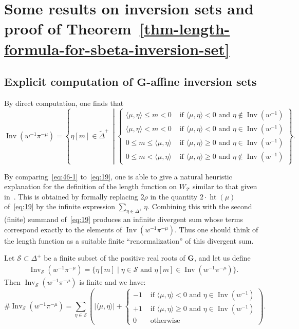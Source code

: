 \documentclass[ALCO,ThmDefs,Unicode]{cedram}
\DeclareMathOperator{\height}{ht}
\DeclareMathOperator{\Inv}{Inv}
\newcommand{\bG}{\mathbf{G}}
\newcommand{\cS}{\mathcal{S}}
\newcommand{\cT}{\mathcal{T}}
\newcommand{\suchthat}{\mid}
\newcommand{\textif}{\text{ if }}
\newcommand{\textand}{\text{ and }}
\newcommand{\tDelta}{\widetilde{\Delta}}
\begin{document}
\section{Some results on inversion sets and proof of Theorem~\ref{thm-length-formula-for-sbeta-inversion-set}}

\subsection{Explicit computation of \texorpdfstring{$\bG$}{G}-affine inversion sets}

By direct computation, one finds that
\begin{equation}\label{eq:46-1}
\Inv(w^{-1}\pi^{-\mu}) = \left\{ \eta[m]\in\tDelta^+ \,\middle|
\begin{cases}
\langle \mu, \eta \rangle \leq m < 0 & \textif \langle \mu, \eta \rangle < 0 \textand \eta \notin \Inv(w^{-1}) \\
\langle \mu, \eta \rangle < m < 0 & \textif \langle \mu, \eta \rangle < 0 \textand \eta \in \Inv(w^{-1}) \\
0 \leq m \leq \langle \mu, \eta \rangle & \textif \langle \mu, \eta \rangle \geq 0 \textand \eta \in \Inv(w^{-1}) \\
0 \leq m < \langle \mu, \eta \rangle & \textif \langle \mu, \eta \rangle \geq 0 \textand \eta \notin \Inv(w^{-1})
\end{cases}
\right\}.
\end{equation}

\begin{rema}
By comparing~\eqref{eq:46-1} to~\eqref{eq:19}, one is able to give a natural heuristic explanation for the definition of the length function on $W_\cT$ similar to that given in~\cite[\S2.11]{K}. This is obtained by formally replacing $2\rho$ in the quantity $2\cdot\height(\mu)$ of~\eqref{eq:19} by the infinite expression $\sum_{\eta\in\Delta^+} \eta$. Combining this with the second (finite) summand of~\eqref{eq:19} produces an infinite divergent sum whose terms correspond exactly to the elements of $\Inv(w^{-1}\pi^{-\mu})$. Thus one should think of the length function as a suitable finite ``renormalization'' of this divergent sum.
\end{rema}

Let $\cS \subset \Delta^+$ be a finite subset of the positive real roots of $\bG$, and let us define
\begin{align*}
\Inv_{\cS}(w^{-1} \pi^{-\mu}) = \{ \eta[m] \suchthat \eta \in \cS \textand \eta[m] \in \Inv(w^{-1} \pi^{-\mu}) \}.
\end{align*}
Then $\Inv_{\cS}(w^{-1} \pi^{-\mu})$ is finite and we have:
\begin{equation}\label{E:invS}
\# \Inv_{\cS}(w^{-1} \pi^{-\mu}) = \sum_{\eta \in \cS} \left(|\langle \mu, \eta \rangle| +
\begin{cases}
-1 & \textif \langle \mu, \eta \rangle < 0 \textand \eta \in \Inv(w^{-1}) \\
+1 & \textif \langle \mu, \eta \rangle \geq 0 \textand \eta \in \Inv(w^{-1}) \\
0 & \text{ otherwise}
\end{cases}
\right).
\end{equation}
\end{document}
